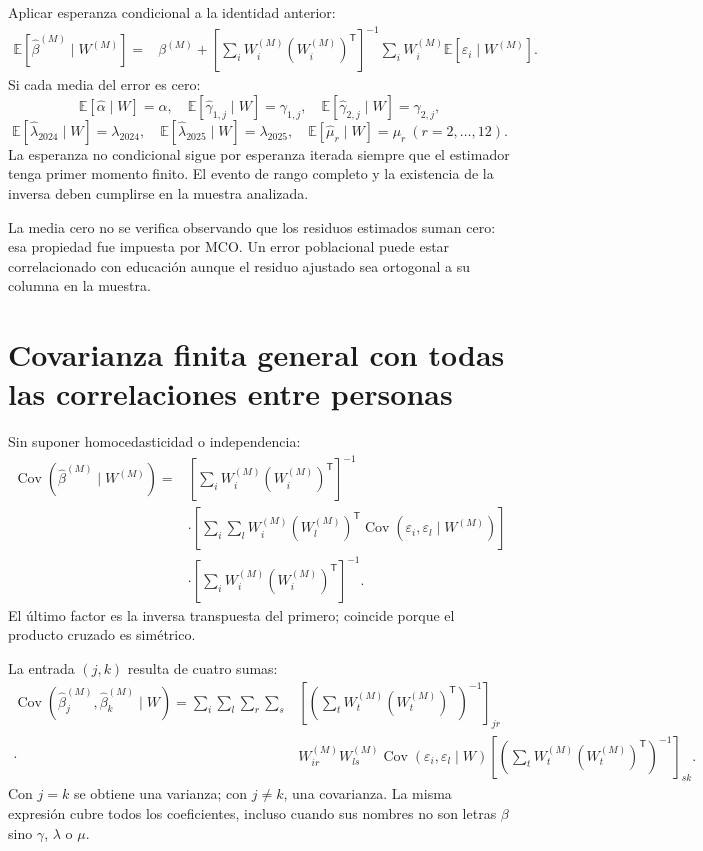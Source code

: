 \documentclass[11pt,a4paper]{article}
\newcommand{\E}{\mathbb E}
\DeclareMathOperator{\Cov}{Cov}
\begin{document}
Aplicar esperanza condicional a la identidad anterior:
\[
\begin{aligned}
\E[\widehat\beta^{(M)}\mid W^{(M)}]
={}&\beta^{(M)}
+\left[\sum_iW_i^{(M)}(W_i^{(M)})^{\mathsf T}\right]^{-1}
\sum_iW_i^{(M)}\E[\varepsilon_i\mid W^{(M)}].
\end{aligned}
\]
Si cada media del error es cero:
\[
\E[\widehat\alpha\mid W]=\alpha,\quad
\E[\widehat\gamma_{1,j}\mid W]=\gamma_{1,j},\quad
\E[\widehat\gamma_{2,j}\mid W]=\gamma_{2,j},
\]
\[
\E[\widehat\lambda_{2024}\mid W]=\lambda_{2024},\quad
\E[\widehat\lambda_{2025}\mid W]=\lambda_{2025},\quad
\E[\widehat\mu_r\mid W]=\mu_r\ (r=2,\ldots,12).
\]
La esperanza no condicional sigue por esperanza iterada siempre que el estimador tenga primer momento finito. El evento de rango completo y la existencia de la inversa deben cumplirse en la muestra analizada.

La media cero no se verifica observando que los residuos estimados suman cero: esa propiedad fue impuesta por MCO. Un error poblacional puede estar correlacionado con educación aunque el residuo ajustado sea ortogonal a su columna en la muestra.

\clearpage
\section{Covarianza finita general con todas las correlaciones entre personas}

Sin suponer homocedasticidad o independencia:
\[
\begin{aligned}
\Cov(\widehat\beta^{(M)}\mid W^{(M)})
={}&\left[\sum_iW_i^{(M)}(W_i^{(M)})^{\mathsf T}\right]^{-1}\\
&\cdot\left[\sum_i\sum_lW_i^{(M)}(W_l^{(M)})^{\mathsf T}
\Cov(\varepsilon_i,\varepsilon_l\mid W^{(M)})\right]\\
&\cdot\left[\sum_iW_i^{(M)}(W_i^{(M)})^{\mathsf T}\right]^{-1}.
\end{aligned}
\]
El último factor es la inversa transpuesta del primero; coincide porque el producto cruzado es simétrico.

La entrada $(j,k)$ resulta de cuatro sumas:
\[
\begin{aligned}
\Cov(\widehat\beta_j^{(M)},\widehat\beta_k^{(M)}\mid W)
=\sum_i\sum_l\sum_r\sum_s&
\left[\left(\sum_tW_t^{(M)}(W_t^{(M)})^{\mathsf T}\right)^{-1}\right]_{jr}\\
\cdot&W_{ir}^{(M)}W_{ls}^{(M)}
\Cov(\varepsilon_i,\varepsilon_l\mid W)
\left[\left(\sum_tW_t^{(M)}(W_t^{(M)})^{\mathsf T}\right)^{-1}\right]_{sk}.
\end{aligned}
\]
Con $j=k$ se obtiene una varianza; con $j\ne k$, una covarianza. La misma expresión cubre todos los coeficientes, incluso cuando sus nombres no son letras $\beta$ sino $\gamma$, $\lambda$ o $\mu$.
\end{document}
